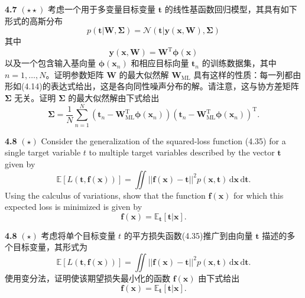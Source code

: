 \documentclass{article}
\begin{document}
\textbf{4.7} $(\star\star)$ 考虑一个用于多变量目标变量 $\mathbf{t}$ 的线性基函数回归模型，其具有如下形式的高斯分布
\begin{equation}
p(\mathbf{t}|\mathbf{W}, \boldsymbol{\Sigma}) = \mathcal{N}(\mathbf{t}|\mathbf{y}(\mathbf{x}, \mathbf{W}), \boldsymbol{\Sigma}) \tag{4.61}
\end{equation}
其中
\begin{equation}
\mathbf{y}(\mathbf{x}, \mathbf{W}) = \mathbf{W}^{\mathrm{T}} \boldsymbol{\phi}(\mathbf{x}) \tag{4.62}
\end{equation}
以及一个包含输入基向量 $\boldsymbol{\phi}(\mathbf{x}_n)$ 和相应目标向量 $\mathbf{t}_n$ 的训练数据集，其中 $n = 1, \dots, N$。证明参数矩阵 $\mathbf{W}$ 的最大似然解 $\mathbf{W}_{\text{ML}}$ 具有这样的性质：每一列都由形如(4.14)的表达式给出，这是各向同性噪声分布的解。请注意，这与协方差矩阵 $\boldsymbol{\Sigma}$ 无关。证明 $\boldsymbol{\Sigma}$ 的最大似然解由下式给出
\begin{equation}
\boldsymbol{\Sigma} = \frac{1}{N} \sum_{n=1}^{N} \left( \mathbf{t}_n - \mathbf{W}_{\text{ML}}^{\mathrm{T}} \boldsymbol{\phi}(\mathbf{x}_n) \right) \left( \mathbf{t}_n - \mathbf{W}_{\text{ML}}^{\mathrm{T}} \boldsymbol{\phi}(\mathbf{x}_n) \right)^{\mathrm{T}}. \tag{4.63}
\end{equation}


\textbf{4.8} $(\star)$ Consider the generalization of the squared-loss function (4.35) for a single target variable $t$ to multiple target variables described by the vector $\mathbf{t}$ given by
\begin{equation}
\mathbb{E}[L(\mathbf{t}, \mathbf{f}(\mathbf{x}))] = \iint ||\mathbf{f}(\mathbf{x}) - \mathbf{t}||^2 p(\mathbf{x}, \mathbf{t}) \,\mathrm{d}\mathbf{x}\,\mathrm{d}\mathbf{t}. \tag{4.64}
\end{equation}
Using the calculus of variations, show that the function $\mathbf{f}(\mathbf{x})$ for which this expected loss is minimized is given by
\begin{equation}
\mathbf{f}(\mathbf{x}) = \mathbb{E}_{\mathbf{t}}[\mathbf{t}|\mathbf{x}]. \tag{4.65}
\end{equation}

\textbf{4.8} $(\star)$ 考虑将单个目标变量 $t$ 的平方损失函数(4.35)推广到由向量 $\mathbf{t}$ 描述的多个目标变量，其形式为
\begin{equation}
\mathbb{E}[L(\mathbf{t}, \mathbf{f}(\mathbf{x}))] = \iint ||\mathbf{f}(\mathbf{x}) - \mathbf{t}||^2 p(\mathbf{x}, \mathbf{t}) \,\mathrm{d}\mathbf{x}\,\mathrm{d}\mathbf{t}. \tag{4.64}
\end{equation}
使用变分法，证明使该期望损失最小化的函数 $\mathbf{f}(\mathbf{x})$ 由下式给出
\begin{equation}
\mathbf{f}(\mathbf{x}) = \mathbb{E}_{\mathbf{t}}[\mathbf{t}|\mathbf{x}]. \tag{4.65}
\end{equation}
\end{document}
